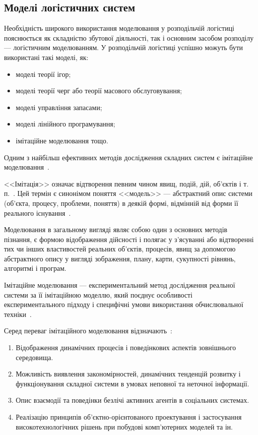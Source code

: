 \subsection{Моделі логістичних систем}
Необхідність широкого використання моделювання у розподільчій логістиці пояснюється як складністю збутової діяльності, так і основним засобом розподілу --- логістичним моделюванням. 
У розподільчій логістиці успішно можуть бути використані такі моделі, як:
\begin{itemize}
	\item моделі теорії ігор; 
	\item моделі теорії черг або теорії масового обслуговування;
	\item моделі управління запасами;
	\item моделі лінійного програмування;
	\item імітаційне моделювання тощо.
\end{itemize}

Одним з найбільш ефективних методів дослідження складних систем є імітаційне моделювання~\cite{Kobelev2003}.

<<Імітація>> означає відтворення певним чином явищ, подій, дій, об'єктів і т. п.~\cite{Kobelev2003}. 
Цей термін є синонімом поняття <<модель>> — абстрактний опис системи (об'єкта, процесу, проблеми, поняття) в деякій формі, відмінній від форми її реального існування~\cite{Emelyanov2002}. 

Моделювання в загальному вигляді являє собою один з основних методів пізнання, є формою відображення дійсності і полягає у з'ясуванні або відтворенні тих чи інших властивостей реальних об'єктів, процесів, явищ за допомогою абстрактного опису у вигляді зображення, плану, карти, сукупності рівнянь, алгоритмі і програм.

Імітаційне моделювання --- експериментальний метод дослідження реальної системи за її імітаційною моделлю, який поєднує особливості експериментального підходу і специфічні умови використання обчислювальної техніки~\cite{Emelyanov2002}.

Серед переваг імітаційного моделювання відзначають~\cite{Emelyanov2002}: 
\begin{enumerate}
	\item Відображення динамічних процесів і поведінкових аспектів зовнішнього середовища.
	\item Можливість виявлення закономірностей, динамічних тенденцій розвитку і функціонування складної системи в умовах неповної та неточної інформації.
	\item Опис взаємодії та поведінки безлічі активних агентів в соціальних системах.
	\item Реалізацію принципів об'єктно-орієнтованого проектування і застосування високотехнологічних рішень при побудові комп'ютерних моделей та ін.
\end{enumerate}

